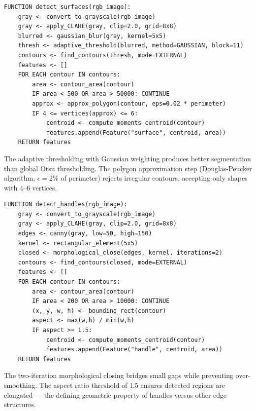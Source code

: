 \documentclass[11pt,a4paper]{article}
\begin{document}
\begin{algorithmbox}
\begin{lstlisting}
FUNCTION detect_surfaces(rgb_image):
    gray <- convert_to_grayscale(rgb_image)
    gray <- apply_CLAHE(gray, clip=2.0, grid=8x8)
    blurred <- gaussian_blur(gray, kernel=5x5)
    thresh <- adaptive_threshold(blurred, method=GAUSSIAN, block=11)
    contours <- find_contours(thresh, mode=EXTERNAL)
    features <- []
    FOR EACH contour IN contours:
        area <- contour_area(contour)
        IF area < 500 OR area > 50000: CONTINUE
        approx <- approx_polygon(contour, eps=0.02 * perimeter)
        IF 4 <= vertices(approx) <= 6:
            centroid <- compute_moments_centroid(contour)
            features.append(Feature("surface", centroid, area))
    RETURN features
\end{lstlisting}
\end{algorithmbox}

The adaptive thresholding with Gaussian weighting produces better segmentation than global Otsu thresholding. The polygon approximation step (Douglas-Peucker algorithm, $\epsilon = 2\%$ of perimeter) rejects irregular contours, accepting only shapes with 4--6 vertices.

\begin{algorithmbox}
\begin{lstlisting}
FUNCTION detect_handles(rgb_image):
    gray <- convert_to_grayscale(rgb_image)
    gray <- apply_CLAHE(gray, clip=2.0, grid=8x8)
    edges <- canny(gray, low=50, high=150)
    kernel <- rectangular_element(5x5)
    closed <- morphological_close(edges, kernel, iterations=2)
    contours <- find_contours(closed, mode=EXTERNAL)
    features <- []
    FOR EACH contour IN contours:
        area <- contour_area(contour)
        IF area < 200 OR area > 10000: CONTINUE
        (x, y, w, h) <- bounding_rect(contour)
        aspect <- max(w,h) / min(w,h)
        IF aspect >= 1.5:
            centroid <- compute_moments_centroid(contour)
            features.append(Feature("handle", centroid, area))
    RETURN features
\end{lstlisting}
\end{algorithmbox}

The two-iteration morphological closing bridges small gaps while preventing over-smoothing. The aspect ratio threshold of 1.5 ensures detected regions are elongated --- the defining geometric property of handles versus other edge structures.
\end{document}
